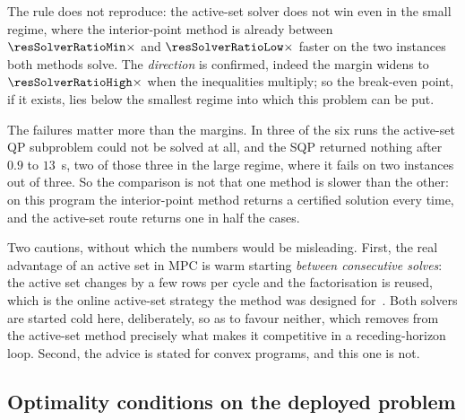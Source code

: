 \documentclass[11pt,a4paper]{article}
\begin{document}
\begin{table}[htbp]
  \centering
  \small
  \caption{%
  The same three instances solved by a primal--dual interior-point method and by an SQP with an active-set
  QP solver, in both obstacle regimes: \emph{penalty} keeps the obstacles in the cost, $\ell^1$ carries them
  as constraints with slacks (Section~\ref{sec:l1}). Both solvers are started cold. Bold: the faster of the
  two. \emph{fail} marks a run in which the active-set QP subproblem could not be solved at all.
  $^\dagger$the only large-regime run that returns a solution ends at an objective $0.2\%$ away from
  IPOPT's, so that ratio is indicative rather than an exact like-for-like comparison.}
  \label{res:tab:solvercmp}
\end{table}

The rule does not reproduce: the active-set solver does not win even in the small regime, where the
interior-point method is already between $\resSolverRatioMin\times$ and $\resSolverRatioLow\times$ faster on
the two instances both methods solve. The \emph{direction} is confirmed, indeed the margin widens to
$\resSolverRatioHigh\times$ when the inequalities multiply; so the break-even point, if it exists, lies below
the smallest regime into which this problem can be put.

The failures matter more than the margins. In three of the six runs the active-set QP subproblem could not
be solved at all, and the SQP returned nothing after $0.9$ to $13$~s, two of those three in the large
regime, where it fails on two instances out of three. So the comparison is not that one method is slower
than the other: on this program the interior-point method returns a certified solution every time, and the
active-set route returns one in half the cases.

Two cautions, without which the numbers would be misleading. First, the real advantage of an active set in
MPC is warm starting \emph{between consecutive solves}: the active set changes by a few rows per cycle and
the factorisation is reused, which is the online active-set strategy the method was designed for~\cite{ferreau2014qpoases}. Both
solvers are started cold here, deliberately, so as to favour neither, which removes from the active-set
method precisely what makes it competitive in a receding-horizon loop. Second, the advice is stated for
convex programs, and this one is not.


\subsection{Optimality conditions on the deployed problem}
\label{sec:kkt}
\end{document}
